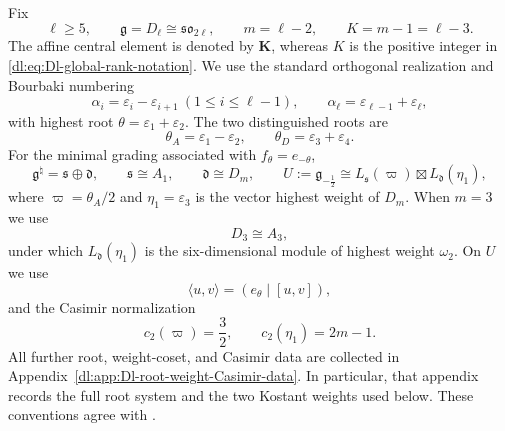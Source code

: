 \documentclass[11pt,reqno]{amsart}
\theoremstyle{definition}
\theoremstyle{remark}
\begin{document}
Fix
\begin{equation}
  \ell\ge5,\qquad
  \mathfrak g=D_\ell\cong\mathfrak{so}_{2\ell},\qquad
  m=\ell-2,\qquad K=m-1=\ell-3.
  \label{dl:eq:Dl-global-rank-notation}
\end{equation}
The affine central element is denoted by $\mathbf K$, whereas $K$ is the
positive integer in \eqref{dl:eq:Dl-global-rank-notation}.  We use the standard
orthogonal realization and Bourbaki numbering
\begin{equation}
 \alpha_i=\varepsilon_i-\varepsilon_{i+1}\ (1\le i\le\ell-1),
 \qquad \alpha_\ell=\varepsilon_{\ell-1}+\varepsilon_\ell,
 \label{dl:eq:Dl-simple-roots}
\end{equation}
with highest root $\theta=\varepsilon_1+\varepsilon_2$.  The two distinguished
roots are
\begin{equation}
 \theta_A=\varepsilon_1-\varepsilon_2,
 \qquad \theta_D=\varepsilon_3+\varepsilon_4.
 \label{dl:eq:Dl-two-natural-highest-roots}
\end{equation}
For the minimal grading associated with $f_\theta=e_{-\theta}$,
\begin{equation*}
 \mathfrak g^\natural=\mathfrak s\oplus\mathfrak d,
 \qquad \mathfrak s\cong A_1,
 \qquad \mathfrak d\cong D_m,
 \qquad
 U:=\mathfrak g_{-\frac12}
 \cong L_{\mathfrak s}(\varpi)\boxtimes L_{\mathfrak d}(\eta_1),
\end{equation*}
where $\varpi=\theta_A/2$ and $\eta_1=\varepsilon_3$ is the vector highest
weight of $D_m$.  When $m=3$ we use
\begin{equation}
 D_3\cong A_3,
 \label{dl:eq:Dl-D3-A3-identification}
\end{equation}
under which $L_{\mathfrak d}(\eta_1)$ is the six-dimensional module of
highest weight $\omega_2$.  On $U$ we use
\begin{equation}
 \langle u,v\rangle=(e_\theta\mid[u,v]),
 \label{dl:eq:Dl-skew-form}
\end{equation}
and the Casimir normalization
\begin{equation}
 c_2(\varpi)=\frac32,
 \qquad c_2(\eta_1)=2m-1.
 \label{dl:eq:Dl-basic-Casimir-values}
\end{equation}
All further root, weight-coset, and Casimir data are collected in
Appendix~\ref{dl:app:Dl-root-weight-Casimir-data}.  In particular, that
appendix records the full root system and the two Kostant weights used below.  These conventions agree with
\cite{Bourbaki2002,KacRoanWakimoto2003,KacWakimoto2004,
AdamovicKacMosenederFrajriaPapiPerse2018}.
\end{document}
